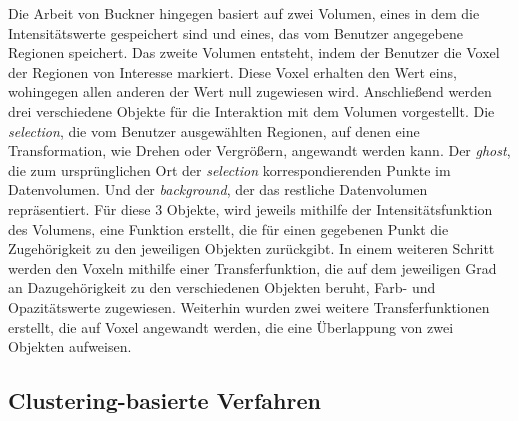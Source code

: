 Die Arbeit von Buckner \cite{bruckner2005volumeshop} hingegen basiert auf zwei Volumen, eines in dem die Intensitätswerte gespeichert sind und eines, das vom Benutzer angegebene Regionen speichert.
Das zweite Volumen entsteht, indem der Benutzer die Voxel der Regionen von Interesse markiert. Diese Voxel erhalten den Wert eins, wohingegen allen anderen der Wert null zugewiesen wird.
Anschließend werden drei verschiedene Objekte für die Interaktion mit dem Volumen vorgestellt. Die \textit{selection}, die vom Benutzer ausgewählten Regionen, auf denen eine Transformation, wie Drehen oder Vergrößern, angewandt werden kann. Der \textit{ghost}, die zum ursprünglichen Ort der \textit{selection} korrespondierenden Punkte im Datenvolumen. Und der \textit{background}, der das restliche Datenvolumen repräsentiert.
Für diese 3 Objekte, wird jeweils mithilfe der Intensitätsfunktion des Volumens, eine Funktion erstellt, die für einen gegebenen Punkt die Zugehörigkeit zu den jeweiligen Objekten zurückgibt.
\newline
In einem weiteren Schritt werden den Voxeln mithilfe einer Transferfunktion, die auf dem jeweiligen Grad an Dazugehörigkeit zu den verschiedenen Objekten beruht, Farb- und Opazitätswerte zugewiesen.
Weiterhin wurden zwei weitere Transferfunktionen erstellt, die auf Voxel angewandt werden, die eine Überlappung von zwei Objekten aufweisen.



\subsection{Clustering-basierte Verfahren}


